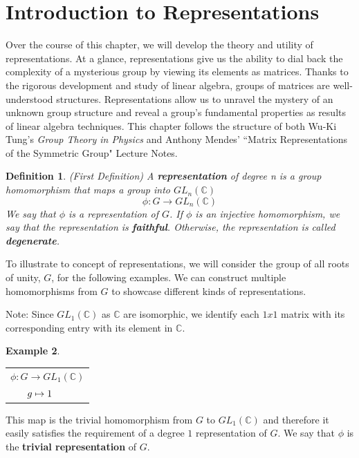 \documentclass[10pt]{ucthesis}
\newtheorem{definition}{Definition}[chapter]
\newtheorem{example}[definition]{Example}
\begin{document}
\section{Introduction to Representations}

Over the course of this chapter, we will develop the theory and utility of representations. At a glance, representations give us the ability to dial back the complexity of a mysterious group by viewing its elements as matrices. Thanks to the rigorous development and study of linear algebra, groups of matrices are well-understood structures. Representations allow us to unravel the mystery of an unknown group structure and reveal a group's fundamental properties as results of linear algebra techniques. This chapter follows the structure of both Wu-Ki Tung's \textit{Group Theory in Physics} and Anthony Mendes' ``Matrix Representations of the Symmetric Group" Lecture Notes. \cite{Tung,Mendes}

\begin{definition}
	(First Definition) A \textbf{representation} of degree n is a group homomorphism that maps a group into $GL_n(\mathbb{C})$
	$$\phi:G\rightarrow GL_n(\mathbb{C})$$
	We say that $\phi$ is a representation of $G$. If $\phi$ is an injective homomorphism, we say that the representation is \textbf{faithful}. Otherwise, the representation is called \textbf{degenerate}.
\end{definition}

To illustrate to concept of representations, we will consider the group of all roots of unity, $G$, for the following examples. We can construct multiple homomorphisms from $G$ to showcase different kinds of representations. 

\noindent Note: Since $GL_1(\mathbb{C})$ as $\mathbb{C}$ are isomorphic, we identify each $1x1$ matrix with its corresponding entry with its element in $\mathbb{C}$.

\begin{example}\end{example}\renewcommand{\arraystretch}{0.7}\begin{center}
			\begin{tabular}{l}$\phi:G\rightarrow GL_1(\mathbb{C})$\\
			$\hspace{6mm}g\mapsto 1$
			\end{tabular}
		\end{center}


	

\noindent This map is the trivial homomorphism from $G$ to $GL_1(\mathbb{C})$ and therefore it easily satisfies the requirement of a degree $1$ representation of $G$. We say that $\phi$ is the \textbf{trivial representation} of $G$.
\end{document}

